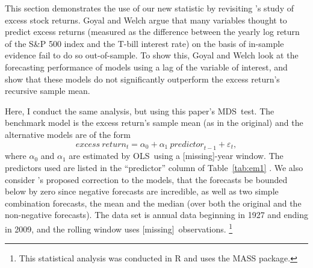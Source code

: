 \documentclass[12pt,fleqn]{article}
\newcommand\citepos[2][]{\citeauthor{#2}'s \citeyearpar[#1]{#2}}
\providecommand\windowlength{[missing]}
\providecommand\empiricaltable{[missing]}
\theoremstyle{definition}
\newcommand{\ep}{\varepsilon}
\newcommand{\mds}{MDS}
\newcommand{\ols}{OLS}
\newcommand{\oos}{OOS}
\begin{document}
This section demonstrates the use of our new statistic by revisiting
\citepos{GoW:08} study of excess stock returns.  Goyal and Welch argue
that many variables thought to predict excess returns (measured as the
difference between the yearly log return of the S\&P 500 index and the
T-bill interest rate) on the basis of in-sample evidence fail to do so
out-of-sample.  To show this, Goyal and Welch look at the forecasting
performance of models using a lag of the variable of interest, and
show that these models do not significantly outperform the excess
return's recursive sample mean.

Here, I conduct the same analysis, but using this paper's \mds\ test.
The benchmark model is the excess return's sample mean (as in the
original) and the alternative models are of the form
\begin{equation*}
  \mathit{excess~return}_{t} = \alpha_{0} + \alpha_{1}\
  \mathit{predictor}_{t-1} + \ep_{t},
\end{equation*}
where $\alpha_{0}$ and
$\alpha_{1}$ are estimated by \ols\ using a \windowlength-year window.
The predictors used are listed in the ``predictor'' column of
Table~\ref{tab:em1} \citep[see][for a detailed description of the
variables]{GoW:08}.  We also consider \citepos{CaT:08} proposed
correction to the models, that the forecasts be bounded below by zero
since negative forecasts are incredible, as well as two simple
combination forecasts, the mean and the median (over both the original
and the non-negative forecasts).  The data set is annual data
beginning in 1927 and ending in 2009, and the rolling window uses
\windowlength\ observations.%
\footnote{This statistical analysis was conducted in R \citep{R} and
  uses the MASS \citep[7.3-22]{VeR:02} package.} %

\begin{table}[tb!]
  \centering
  \empiricaltable
\caption{Results from \oos\ comparison of equity premium prediction
  models; the benchmark is the recursive sample mean of the equity
  premium and each alternative model is a constant and single lag of
  the variable listed in the ``predictor'' column.  The dataset begins
  in 1927 and ends in 2009 and is annual data. The ``value'' column
  lists the value of this paper's \oos\ statistic, the ``naive''
  column indicates whether the statistic is significant at standard
  critical values, and the ``corrected'' column indicates significance
  using the critical values proposed in Theorem~\ref{res:2} that
  account for the number of models.  See Section~\ref{sec:3} for details.}
\label{tab:em1}
\end{table}
\end{document}
